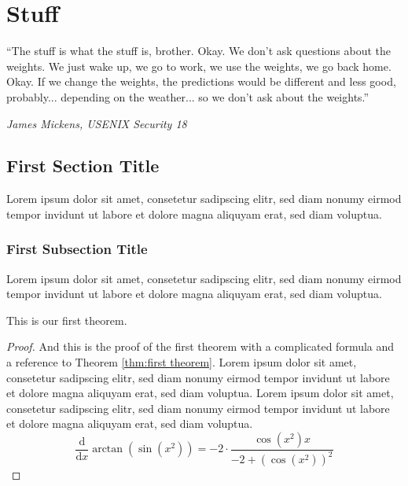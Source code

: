\documentclass[a4paper, oneside]{discothesis}
\begin{document}
\chapter{Stuff}


\newpage

\begin{flushright}
	``The stuff is what the stuff is, brother. Okay. We don't ask questions about the weights. We just wake up, we go to work, we use the weights, we go back home. Okay. If we change the weights, the predictions would be different and less good, probably... depending on the weather... so we don't ask about the weights.''
	
	\textit{\textemdash{} James Mickens, USENIX Security 18~\cite{218395}}
\end{flushright}

\bigskip

\section{First Section Title}

Lorem ipsum dolor sit amet, consetetur sadipscing elitr, sed diam nonumy eirmod tempor invidunt ut labore et dolore magna aliquyam erat, sed diam voluptua.

\subsection{First Subsection Title}

Lorem ipsum dolor sit amet, consetetur sadipscing elitr, sed diam nonumy eirmod tempor invidunt ut labore et dolore magna aliquyam erat, sed diam voluptua.

\begin{theorem} \label{thm:first theorem}
	This is our first theorem.
\end{theorem}

\begin{proof}
	And this is the proof of the first theorem with a complicated formula and a reference to Theorem \ref{thm:first theorem}. Lorem ipsum dolor sit amet, consetetur sadipscing elitr, sed diam nonumy eirmod tempor invidunt ut labore et dolore magna aliquyam erat, sed diam voluptua. Lorem ipsum dolor sit amet, consetetur sadipscing elitr, sed diam nonumy eirmod tempor invidunt ut labore et dolore magna aliquyam erat, sed diam voluptua.
	\begin{equation}
		{\frac {\mathrm d}{\mathrm dx}}\arctan(\sin({x}^{2}))=-2 \cdot {\frac {\cos({x}^{2})x}{-2+\left (\cos({x}^{2})\right )^{2}}}
	\end{equation}	
\end{proof}
\end{document}
